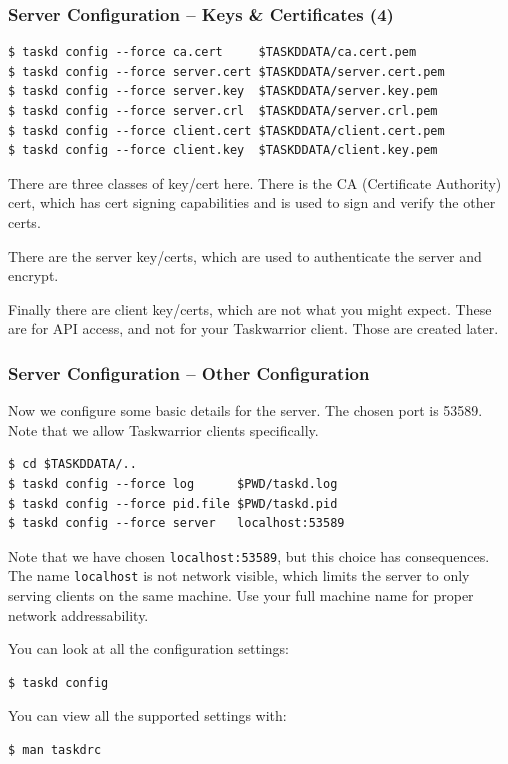 \documentclass[t,handout]{beamer}
\begin{document}
\begin{frame}[fragile]\frametitle{Server Configuration -- Keys \& Certificates (4)}
    \vfill
    \begin{lstlisting}
$ taskd config --force ca.cert     $TASKDDATA/ca.cert.pem
$ taskd config --force server.cert $TASKDDATA/server.cert.pem
$ taskd config --force server.key  $TASKDDATA/server.key.pem
$ taskd config --force server.crl  $TASKDDATA/server.crl.pem
$ taskd config --force client.cert $TASKDDATA/client.cert.pem
$ taskd config --force client.key  $TASKDDATA/client.key.pem\end{lstlisting}

    There are three classes of key/cert here. There is the CA (Certificate Authority) cert, which has cert signing capabilities and is used to sign and verify the other certs.

    There are the server key/certs, which are used to authenticate the server and encrypt.

    Finally there are client key/certs, which are not what you might  expect. These are for API access, and not for your Taskwarrior client. Those are created later.
\end{frame}

\begin{frame}[fragile]\frametitle{Server Configuration -- Other Configuration}
    Now we configure some basic details for the server.  The chosen port is 53589. Note that we allow Taskwarrior clients specifically.

    \begin{lstlisting}
$ cd $TASKDDATA/..
$ taskd config --force log      $PWD/taskd.log
$ taskd config --force pid.file $PWD/taskd.pid
$ taskd config --force server   localhost:53589\end{lstlisting}

    Note that we have chosen \verb+localhost:53589+, but this choice has consequences. The name \verb+localhost+ is not network visible, which limits the server to only serving clients on the same machine. Use your full machine name for proper network addressability.

    You can look at all the configuration settings:

    \begin{lstlisting}
$ taskd config\end{lstlisting}

    You can view all the supported settings with:

    \begin{lstlisting}
$ man taskdrc\end{lstlisting}
\end{frame}
\end{document}
